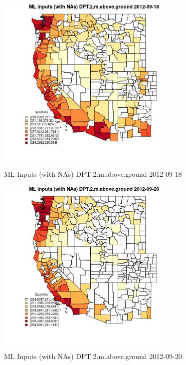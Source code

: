 \begin{figure} 
\centering  
\includegraphics[width=0.77\textwidth]{Code_Outputs/Report_ML_input_PM25_Step4_part_e_de_duplicated_aves_compiled_2019-05-14wNAs_CountyDPT2mabovegroundMean2012-09-18_2012-09-18.jpg} 
\caption{\label{fig:Report_ML_input_PM25_Step4_part_e_de_duplicated_aves_compiled_2019-05-14wNAsCountyDPT2mabovegroundMean2012-09-18_2012-09-18}ML Inputs (with NAs) DPT.2.m.above.ground 2012-09-18} 
\end{figure} 
 

\begin{figure} 
\centering  
\includegraphics[width=0.77\textwidth]{Code_Outputs/Report_ML_input_PM25_Step4_part_e_de_duplicated_aves_compiled_2019-05-14wNAs_CountyDPT2mabovegroundMean2012-09-20_2012-09-20.jpg} 
\caption{\label{fig:Report_ML_input_PM25_Step4_part_e_de_duplicated_aves_compiled_2019-05-14wNAsCountyDPT2mabovegroundMean2012-09-20_2012-09-20}ML Inputs (with NAs) DPT.2.m.above.ground 2012-09-20} 
\end{figure} 
 

